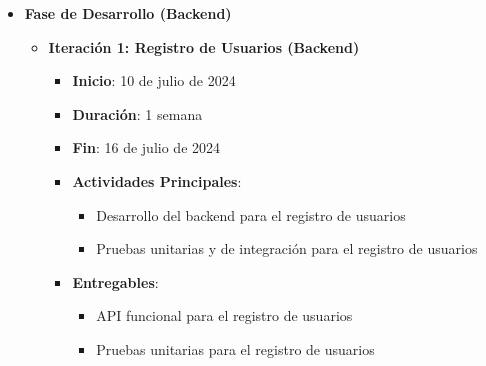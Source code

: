 \begin{itemize}
    \item \textbf{Fase de Desarrollo (Backend)}
          \begin{itemize}
              \item \textbf{Iteración 1: Registro de Usuarios (Backend)}
                    \begin{itemize}
                        \item \textbf{Inicio}: 10 de julio de 2024
                        \item \textbf{Duración}: 1 semana
                        \item \textbf{Fin}: 16 de julio de 2024
                        \item \textbf{Actividades Principales}:
                              \begin{itemize}
                                  \item Desarrollo del backend para el registro de usuarios
                                  \item Pruebas unitarias y de integración para el registro de usuarios
                              \end{itemize}
                        \item \textbf{Entregables}:
                              \begin{itemize}
                                  \item API funcional para el registro de usuarios
                                  \item Pruebas unitarias para el registro de usuarios
                              \end{itemize}
                    \end{itemize}


\end{itemize}
\end{itemize}

